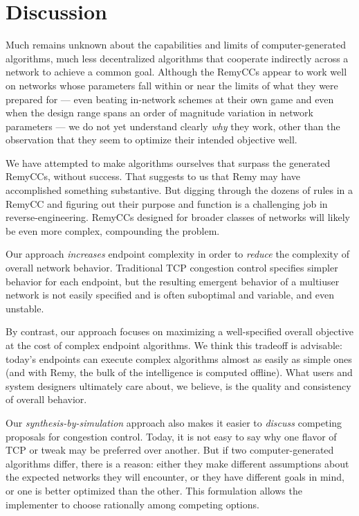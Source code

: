 \section{Discussion}

Much remains unknown about the capabilities and limits of
computer-generated algorithms, much less decentralized algorithms that
cooperate indirectly across a network to achieve a common
goal. Although the RemyCCs appear to work well on networks whose
parameters fall within or near the limits of what they were prepared
for --- even beating in-network schemes at their own game and even
when the design range spans an order of magnitude variation in network
parameters --- we do not yet understand clearly \emph{why} they work,
other than the observation that they seem to optimize their intended
objective well.

We have attempted to make algorithms ourselves that surpass the
generated RemyCCs, without success. That suggests to us that Remy may
have accomplished something substantive. But digging through the
dozens of rules in a RemyCC and figuring out their purpose and
function is a challenging job in reverse-engineering. RemyCCs
designed for broader classes of networks will likely be even
more complex, compounding the problem.

Our approach \emph{increases} endpoint complexity in order to
\emph{reduce} the complexity of overall network behavior. Traditional
TCP congestion control specifies simpler behavior for each endpoint,
but the resulting emergent behavior of a multiuser network is not
easily specified and is often suboptimal and variable, and even
unstable.

By contrast, our approach focuses on maximizing a well-specified
overall objective at the cost of complex endpoint algorithms. We think
this tradeoff is advisable: today's endpoints can execute complex
algorithms almost as easily as simple ones (and with Remy, the bulk of
the intelligence is computed offline). What users and system designers
ultimately care about, we believe, is the quality and consistency of
overall behavior.

Our {\em synthesis-by-simulation} approach also makes it easier to
\emph{discuss} competing proposals for congestion control. Today, it
is not easy to say why one flavor of TCP or tweak may be preferred
over another. But if two computer-generated algorithms differ, there is
a reason: either they make different assumptions about the expected
networks they will encounter, or they have different goals in mind, or
one is better optimized than the other. This formulation allows the
implementer to choose rationally among competing options.

